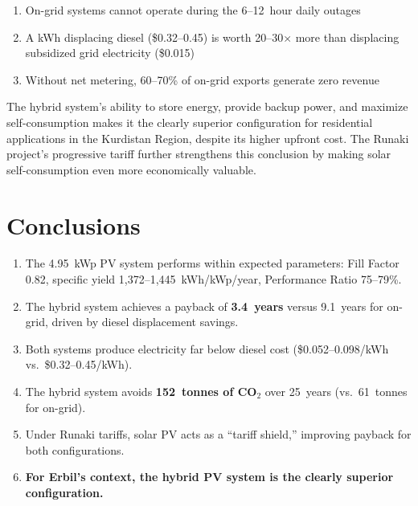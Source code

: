 \begin{enumerate}
    \item On-grid systems cannot operate during the 6--12~hour daily outages
    \item A kWh displacing diesel (\$0.32--0.45) is worth 20--30$\times$ more than displacing subsidized grid electricity (\$0.015)
    \item Without net metering, 60--70\% of on-grid exports generate zero revenue
\end{enumerate}

The hybrid system's ability to store energy, provide backup power, and maximize self-consumption makes it the clearly superior configuration for residential applications in the Kurdistan Region, despite its higher upfront cost. The Runaki project's progressive tariff further strengthens this conclusion by making solar self-consumption even more economically valuable.


\section{Conclusions}

\begin{enumerate}
    \item The 4.95~kWp PV system performs within expected parameters: Fill Factor 0.82, specific yield 1,372--1,445~kWh/kWp/year, Performance Ratio 75--79\%.
    \item The hybrid system achieves a payback of \textbf{3.4~years} versus 9.1~years for on-grid, driven by diesel displacement savings.
    \item Both systems produce electricity far below diesel cost (\$0.052--0.098/kWh vs.\ \$0.32--0.45/kWh).
    \item The hybrid system avoids \textbf{152~tonnes of CO$_2$} over 25~years (vs.\ 61~tonnes for on-grid).
    \item Under Runaki tariffs, solar PV acts as a ``tariff shield,'' improving payback for both configurations.
    \item \textbf{For Erbil's context, the hybrid PV system is the clearly superior configuration.}
\end{enumerate}
